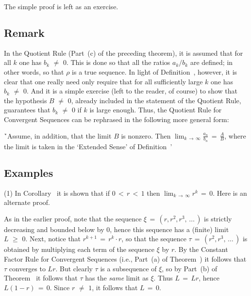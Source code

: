 \V

        The simple proof is left as an exercise. %

\V
\V

            \subsection{\small{\bf Remark}}
            \label{RemrkC60.40}

        In the Quotient Rule (Part~(c) of the preceding theorem), it is assumed that for all $k$ one has $b_{k} \,\,{\neq}\,\, 0$.
    This is done so that all the ratios $a_{k}/b_{k}$ are defined; in other words, so that ${\rho}$ is a true sequence.
    In light of  Definition~, however, it is clear that one really need only require that for all sufficiently large $k$ one has $b_{k} \,\,{\neq}\,\, 0$.
    And it is a simple exercise (left to the reader, of course) to show that the hypothesis $B \,\,{\neq}\,\, 0$, already included in the statement of the Quotient Rule, guarantees that $b_{k} \,\,{\neq}\,\, 0$ if $k$ is large enough.
    Thus, the Quotient Rule for Convergent Sequences can be rephrased in the following more general form:

        \h `Assume, in addition, that the limit $B$ is nonzero.
    Then ${\displaystyle \lim_{k \,{\rightarrow}\, {\infty}} \frac{a_{n}}{b_{n}}  \,=\, \frac{A}{B}}$, where the limit is taken in the `Extended Sense' of Definition~'

\V

            \subsection{\small{\bf Examples}}
            \label{ExampC60.50}

\V

        (1) In Corollary~ it is shown that if $0\,<\,r\,<\,1$ then $\lim_{k \,{\rightarrow}\, {\infty}} r^{k} \,=\, 0$.
    Here is an alternate proof.

        As in the earlier proof, note that the sequence ${\xi} \,=\, (r,r^{2},r^{3},\,{\ldots}\,)$ is strictly decreasing and bounded below by $0$, hence this sequence has a (finite) limit $L\,\,{\geq}\,\,0$.
    Next, notice that $r^{k+1} \,=\, r^{k}{\cdot}r$, so that the sequence ${\tau} \,=\, (r^{2},r^{3},\,{\ldots}\,)$ is obtained by multiplying each term of the sequence ${\xi}$ by $r$.
    By the Constant Factor Rule for Convergent Sequences (i.e., Part~(a) of Theorem~) it follows that ${\tau}$ converges to $Lr$.
    But clearly ${\tau}$ is a subsequence of ${\xi}$, so by Part~(b) of Theorem~ it follows that ${\tau}$ has the {\em same} limit as ${\xi}$.
    Thus $L \,=\, Lr$, hence $L(1-r) \,=\, 0$. Since $r \,\,{\neq}\,\, 1$, it follows that $L \,=\, 0$.

